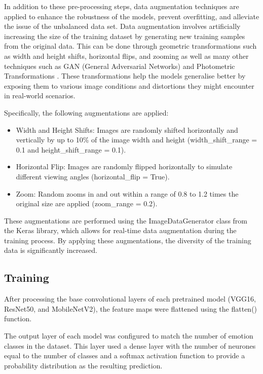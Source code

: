 In addition to these pre-processing steps, data augmentation techniques are applied to enhance the robustness of the models, prevent overfitting, and alleviate the issue of the unbalanced data set. Data augmentation involves artificially increasing the size of the training dataset by generating new training samples from the original data. This can be done through geometric transformations such as width and height shifts, horizontal flips, and zooming as well as many other techniques such as GAN (General Adversarial Networks) and Photometric Transformations \cite{Shorten2019-mj}. These transformations help the models generalise better by exposing them to various image conditions and distortions they might encounter in real-world scenarios.

Specifically, the following augmentations are applied:

\begin{itemize}
\item Width and Height Shifts: Images are randomly shifted horizontally and vertically by up to 10\% of the image width and height (width\_shift\_range = 0.1 and height\_shift\_range = 0.1).
\item Horizontal Flip: Images are randomly flipped horizontally to simulate different viewing angles (horizontal\_flip = True).
\item Zoom: Random zooms in and out within a range of 0.8 to 1.2 times the original size are applied (zoom\_range = 0.2).
\end{itemize}

These augmentations are performed using the ImageDataGenerator class from the Keras library, which allows for real-time data augmentation during the training process. By applying these augmentations, the diversity of the training data is significantly increased.

\subsection{Training}

After processing the base convolutional layers of each pretrained model (VGG16, ResNet50, and MobileNetV2), the feature maps were flattened using the flatten() function.

The output layer of each model was configured to match the number of emotion classes in the dataset. This layer used a dense layer with the number of neurones equal to the number of classes and a softmax activation function to provide a probability distribution as the resulting prediction.

